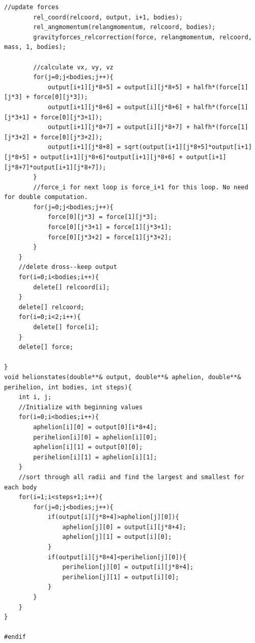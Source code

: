 \documentclass[11pt,a4paper]{article}
\begin{document}
\begin{lstlisting}[title={project3-library-unittest.cpp}]
		//update forces
		rel_coord(relcoord, output, i+1, bodies);
		rel_angmomentum(relangmomentum, relcoord, bodies);
		gravityforces_relcorrection(force, relangmomentum, relcoord, mass, 1, bodies);
		
		//calculate vx, vy, vz
		for(j=0;j<bodies;j++){
			output[i+1][j*8+5] = output[i][j*8+5] + halfh*(force[1][j*3] + force[0][j*3]);
			output[i+1][j*8+6] = output[i][j*8+6] + halfh*(force[1][j*3+1] + force[0][j*3+1]);
			output[i+1][j*8+7] = output[i][j*8+7] + halfh*(force[1][j*3+2] + force[0][j*3+2]);
			output[i+1][j*8+8] = sqrt(output[i+1][j*8+5]*output[i+1][j*8+5] + output[i+1][j*8+6]*output[i+1][j*8+6] + output[i+1][j*8+7]*output[i+1][j*8+7]);
		}
		//force_i for next loop is force_i+1 for this loop. No need for double computation.
		for(j=0;j<bodies;j++){
			force[0][j*3] = force[1][j*3];
			force[0][j*3+1] = force[1][j*3+1];
			force[0][j*3+2] = force[1][j*3+2];
		}
	}
	//delete dross--keep output
	for(i=0;i<bodies;i++){
		delete[] relcoord[i];
	}
	delete[] relcoord;
	for(i=0;i<2;i++){
		delete[] force[i];
	}
	delete[] force;

}
void helionstates(double**& output, double**& aphelion, double**& perihelion, int bodies, int steps){
	int i, j;
	//Initialize with beginning values
	for(i=0;i<bodies;i++){
		aphelion[i][0] = output[0][i*8+4];
		perihelion[i][0] = aphelion[i][0];
		aphelion[i][1] = output[0][0];
		perihelion[i][1] = aphelion[i][1];
	}
	//sort through all radii and find the largest and smallest for each body
	for(i=1;i<steps+1;i++){
		for(j=0;j<bodies;j++){
			if(output[i][j*8+4]>aphelion[j][0]){
				aphelion[j][0] = output[i][j*8+4];
				aphelion[j][1] = output[i][0];
			}
			if(output[i][j*8+4]<perihelion[j][0]){
				perihelion[j][0] = output[i][j*8+4];
				perihelion[j][1] = output[i][0];
			}
		}
	}
}

#endif
\end{lstlisting}
\end{document}
